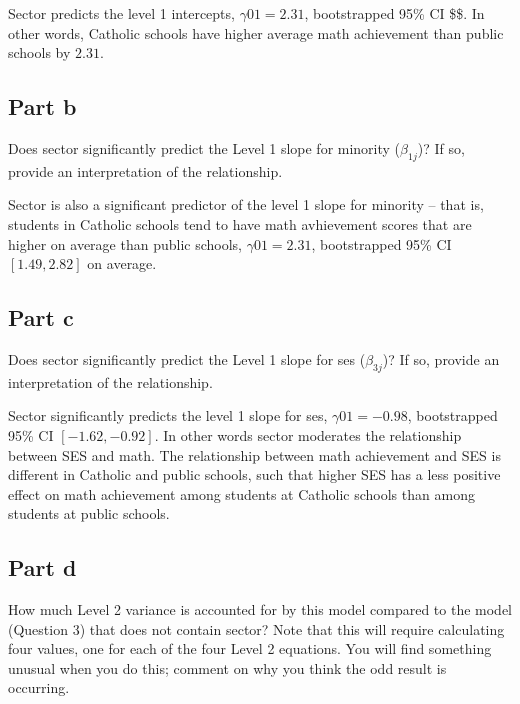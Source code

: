 \documentclass[]{article}
\begin{document}
Sector predicts the level 1 intercepts, \(\gamma01 = 2.31\),
bootstrapped 95\% CI \$\$. In other words, Catholic schools have higher
average math achievement than public schools by \(2.31\).

\subsection{Part b}\label{part-b-2}

Does sector significantly predict the Level 1 slope for minority
(\(\beta_{1j}\))? If so, provide an interpretation of the relationship.

Sector is also a significant predictor of the level 1 slope for minority
-- that is, students in Catholic schools tend to have math avhievement
scores that are higher on average than public schools,
\(\gamma01 = 2.31\), bootstrapped 95\% CI \([1.49, 2.82]\) on average.

\subsection{Part c}\label{part-c-2}

Does sector significantly predict the Level 1 slope for ses
(\(\beta_{3j}\))? If so, provide an interpretation of the relationship.

Sector significantly predicts the level 1 slope for ses,
\(\gamma01 = -0.98\), bootstrapped 95\% CI \([-1.62, -0.92]\). In other
words sector moderates the relationship between SES and math. The
relationship between math achievement and SES is different in Catholic
and public schools, such that higher SES has a less positive effect on
math achievement among students at Catholic schools than among students
at public schools.

\subsection{Part d}\label{part-d-2}

How much Level 2 variance is accounted for by this model compared to the
model (Question 3) that does not contain sector? Note that this will
require calculating four values, one for each of the four Level 2
equations. You will find something unusual when you do this; comment on
why you think the odd result is occurring.
\end{document}
